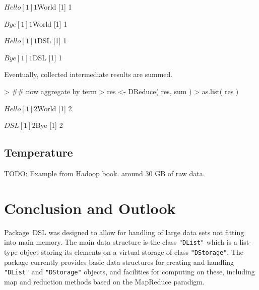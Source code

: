 \documentclass[fleqn]{article}
\newcommand{\pkg}[1]{{\normalfont\fontseries{b}\selectfont #1}}
\let\code=\texttt
\newcommand{\class}[1]{\code{"#1"}}
\begin{document}
\begin{Schunk}
\begin{Soutput}
$Hello
[1] 1

$World
[1] 1

$Bye
[1] 1

$World
[1] 1

$Hello
[1] 1

$DSL
[1] 1

$Bye
[1] 1

$DSL
[1] 1
\end{Soutput}
\end{Schunk}
Eventually, collected intermediate results are summed.
\begin{Schunk}
\begin{Sinput}
> ## now aggregate by term
> res <- DReduce( res, sum )
> as.list( res )
\end{Sinput}
\begin{Soutput}
$Hello
[1] 2

$World
[1] 2

$DSL
[1] 2

$Bye
[1] 2
\end{Soutput}
\end{Schunk}


\subsection{Temperature}

TODO: Example from Hadoop book. around 30 GB of raw data.



\section{Conclusion and Outlook}
\label{sec:conclusion+outlook}

Package~\pkg{DSL} was designed to allow for handling of large data
sets not fitting into main memory. The main data structure is the
class \class{DList} which is a list-type object storing its elements
on a virtual storage of class \class{DStorage}. The package currently
provides basic data structures for creating and handling \class{DList}
and \class{DStorage} objects, and facilities for computing on these,
including map and reduction methods based on the MapReduce paradigm.
\end{document}
